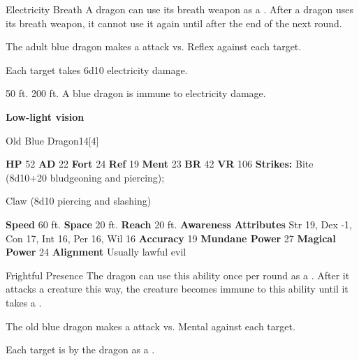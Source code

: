     \begin{freeability}{Electricity Breath}
      A dragon can use its breath weapon as a .
      After a dragon uses its breath weapon, it cannot use it again until after the end of the next round.
      \par The adult blue dragon makes a  attack
        vs. Reflex against each target.
    
    \hit Each target takes 6d10 electricity damage.
    \end{freeability}
  
      
       50 ft.
     200 ft.
     A blue dragon is immune to electricity damage.
    \par\noindent\textbf{Low-light vision}
  

  \begin{monsubsection}{Old Blue Dragon}{14}[4]
    \vspace{-1em}\vspace{-1em}
    \vspace{0em}

    
    

    \begin{spellcontent}
      \begin{spelltargetinginfo}
        \pari \textbf{HP} 52 \monsep
          \textbf{AD} 22 \monsep
          \textbf{Fort} 24 \monsep
          \textbf{Ref} 19 \monsep
          \textbf{Ment} 23
        \pari \textbf{BR} 42 \monsep
        \textbf{VR} 106
        \pari \textbf{Strikes:}
            Bite  (8d10+20 bludgeoning and piercing);
\par Claw  (8d10 piercing and slashing)
      \end{spelltargetinginfo}
    \end{spellcontent}
    \begin{monsterfooter}
      \pari \textbf{Speed} 60 ft. \monsep
        \textbf{Space} 20 ft. \monsep
        \textbf{Reach} 20 ft.
      \pari \textbf{Awareness} 
      \pari \textbf{Attributes}
        Str 19, Dex -1,
        Con 17, Int 16,
        Per 16, Wil 16
      \pari \textbf{Accuracy} 19 \monsep
        \textbf{Mundane Power} 27 \monsep
      \textbf{Magical Power} 24
      \pari \textbf{Alignment} Usually lawful evil
    \end{monsterfooter}
  \end{monsubsection}
  \begin{freeability}{Frightful Presence}
      The dragon can use this ability once per round as a .
      After it attacks a creature this way, the creature becomes immune to this ability until it takes a .
      \par The old blue dragon makes a  attack
        vs. Mental against each target.
    
    \hit Each target is  by the dragon as a .
    \end{freeability}
  

